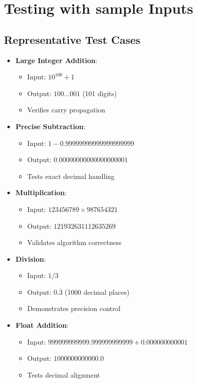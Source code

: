 \documentclass{article}
\begin{document}
\section{Testing with sample Inputs}

\subsection{Representative Test Cases}
\begin{itemize}
    \item \textbf{Large Integer Addition}:
    \begin{itemize}
        \item Input: $10^{100} + 1$
        \item Output: $100\ldots001$ (101 digits)
        \item Verifies carry propagation
    \end{itemize}
    
    \item \textbf{Precise Subtraction}:
    \begin{itemize}
        \item Input: $1 - 0.99999999999999999999$
        \item Output: $0.00000000000000000001$
        \item Tests exact decimal handling
    \end{itemize}
    
    \item \textbf{Multiplication}:
    \begin{itemize}
        \item Input: $123456789 \times 987654321$
        \item Output: $121932631112635269$
        \item Validates algorithm correctness
    \end{itemize}
    
    \item \textbf{Division}:
    \begin{itemize}
        \item Input: $1 / 3$
        \item Output: $0.\overline{3}$ (1000 decimal places)
        \item Demonstrates precision control
    \end{itemize}
    
    \item \textbf{Float Addition}:
    \begin{itemize}
        \item Input: $999999999999.999999999999 + 0.000000000001$
        \item Output: $1000000000000.0$
        \item Tests decimal alignment
    \end{itemize}
\end{itemize}
\end{document}
